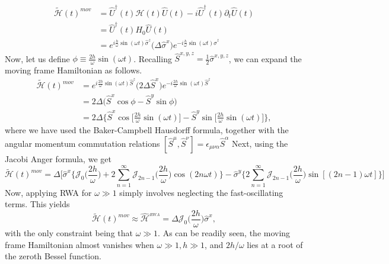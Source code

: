 \documentclass[aps,prb,reprint,showpacs,floatfix,superscriptaddress, onecolumn, nofootinbib, 9pt]{revtex4-2}
\begin{document}
\begin{enumerate}
{\begin{align}
    \tilde{\mathcal{H}}(t)^{mov} &=\hat{U}^\dagger(t) \mathcal{H}(t) \hat{U}(t) - i \hat{U}^\dagger(t) \partial_t \hat{U}(t)\nonumber\\
    &= \hat{U}^\dagger(t) H_0 \hat{U}(t)\nonumber\\
    &= e^{i \frac{h}{\omega} \sin(\omega t)\hat{\sigma}^z} \Big(\Delta \hat{\sigma}^x\Big) e^{-i \frac{h}{\omega} \sin(\omega t)\hat{\sigma}^z}
    \end{align}
    Now, let us define $\phi \equiv \frac{2h}{\omega} \sin(\omega t)$. Recalling $\hat{S}^{x,y,z} = \frac12 \hat{\sigma}^{x,y,z}$, we can expand the moving frame Hamiltonian as follows.
    \begin{align}
    \tilde{\mathcal{H}}(t)^{mov} &= e^{i \frac{2h}{\omega} \sin(\omega t)\hat{S}^z} \Big(2\Delta \hat{S}^x\Big) e^{-i \frac{2h}{\omega} \sin(\omega t)\hat{S}^z}\nonumber\\
    &= 2\Delta \Big(\hat{S}^x \cos{\phi} - \hat{S}^y \sin{\phi}\Big)\nonumber\\
    &= 2\Delta \bigg\{\hat{S}^x\cos\Big[\frac{2h}{\omega}\sin(\omega t)\Big] - \hat{S}^y\sin\Big[\frac{2h}{\omega}\sin(\omega t)\Big]\bigg\},
    \end{align}
    where we have used the Baker-Campbell Hausdorff formula, together with the angular momentum commutation relations $[\hat{S}^\mu, \hat{S}^\nu]=\epsilon_{\mu\nu\alpha}\hat{S}^\alpha$
    Next, using the Jacobi Anger formula, we get
    \begin{equation}
    \tilde{\mathcal{H}}(t)^{mov} = \Delta \Bigg[\hat{\sigma}^x \bigg\{\mathcal{J}_0\Big(\frac{2h}{\omega}\Big) + 2 \sum_{n=1}^{\infty} \mathcal{J}_{2n-1}\Big(\frac{2h}{\omega}\Big)\cos(2n\omega t)\bigg\} -\hat{\sigma}^y\bigg\{2\sum_{n=1}^{\infty} \mathcal{J}_{2n-1}\Big(\frac{2h}{\omega}\Big) \sin\left[(2n-1)\omega t\right]\bigg\}\Bigg]
    \label{eq:hexact}
    \end{equation}
    Now, applying RWA for $\omega \gg 1$ simply involves neglecting the fast-oscillating terms. This yields
    \begin{equation}
    \tilde{\mathcal{H}}(t)^{mov}\approx\hat{\mathcal{H}}^{_{RWA}} = \Delta \mathcal{J}_0 \Big(\frac{2h}{\omega}\Big) \hat{\sigma}^x,
    \end{equation}
with the only constraint being that $\omega \gg 1$. As can be readily seen, the moving frame Hamiltonian almost vanishes when $\omega\gg 1, h\gg 1$, and $2h/\omega$ lies at a root of the zeroth Bessel function.

}
\end{enumerate}
\end{document}
